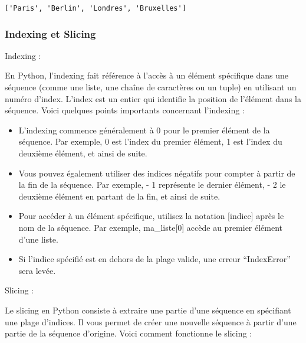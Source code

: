 \documentclass[11pt]{article}
\providecommand{\tightlist}{%
      \setlength{\itemsep}{0pt}\setlength{\parskip}{0pt}}
\begin{document}
    \begin{Verbatim}[commandchars=\\\{\}]
['Paris', 'Berlin', 'Londres', 'Bruxelles']
    \end{Verbatim}

    \hypertarget{indexing-et-slicing}{%
\subsubsection{Indexing et Slicing}\label{indexing-et-slicing}}

Indexing :

En Python, l'indexing fait référence à l'accès à un élément spécifique
dans une séquence (comme une liste, une chaîne de caractères ou un
tuple) en utilisant un numéro d'index. L'index est un entier qui
identifie la position de l'élément dans la séquence. Voici quelques
points importants concernant l'indexing :

\begin{itemize}
\tightlist
\item
  L'indexing commence généralement à 0 pour le premier élément de la
  séquence. Par exemple, 0 est l'index du premier élément, 1 est l'index
  du deuxième élément, et ainsi de suite.
\item
  Vous pouvez également utiliser des indices négatifs pour compter à
  partir de la fin de la séquence. Par exemple, - 1 représente le
  dernier élément, - 2 le deuxième élément en partant de la fin, et
  ainsi de suite.
\item
  Pour accéder à un élément spécifique, utilisez la notation
  {[}indice{]} après le nom de la séquence. Par exemple,
  ma\_liste{[}0{]} accède au premier élément d'une liste.
\item
  Si l'indice spécifié est en dehors de la plage valide, une erreur
  ``IndexError'' sera levée.
\end{itemize}

Slicing :

Le slicing en Python consiste à extraire une partie d'une séquence en
spécifiant une plage d'indices. Il vous permet de créer une nouvelle
séquence à partir d'une partie de la séquence d'origine. Voici comment
fonctionne le slicing :
\end{document}
